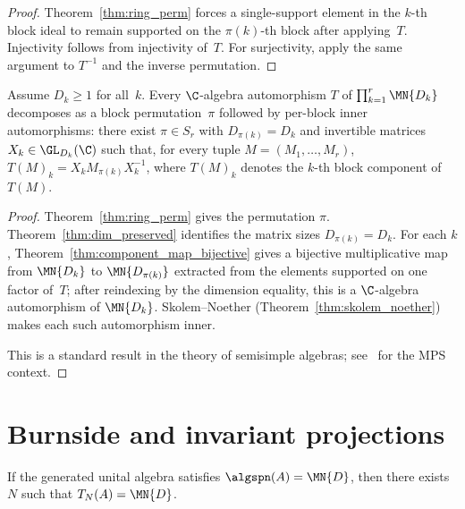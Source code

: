 \begin{proof}
    \leanok
    Theorem~\ref{thm:ring_perm} forces a single-support element in the $k$-th
    block ideal to remain supported on the $\pi(k)$-th block after applying~$T$.
    Injectivity follows from injectivity of~$T$.
    For surjectivity, apply the same argument to $T^{-1}$ and the inverse
    permutation.
\end{proof}

\begin{theorem}\label{thm:pi_auto_decomp}
    \leanok
    Assume $D_k \ge 1$ for all~$k$.
    Every $\C$-algebra automorphism $T$ of $\prod_{k=1}^r \MN{D_k}$
    decomposes as a block permutation~$\pi$ followed by
    per-block inner automorphisms:
    there exist $\pi \in S_r$ with $D_{\pi(k)} = D_k$
    and invertible matrices $X_k \in \GL_{D_k}(\C)$ such that,
    for every tuple $M = (M_1,\ldots,M_r)$,
    $T(M)_k = X_k M_{\pi(k)} X_k^{-1}$,
    where $T(M)_k$ denotes the $k$-th block component of $T(M)$.
\end{theorem}

\begin{proof}
    \leanok
    Theorem~\ref{thm:ring_perm} gives the permutation $\pi$.
    Theorem~\ref{thm:dim_preserved} identifies the matrix sizes
    $D_{\pi(k)} = D_k$.
    For each $k$, Theorem~\ref{thm:component_map_bijective} gives a bijective
    multiplicative map from $\MN{D_k}$ to $\MN{D_{\pi(k)}}$ extracted from the
    elements supported on one factor of~$T$; after reindexing by the dimension equality,
    this is a $\C$-algebra automorphism of $\MN{D_k}$.
    Skolem--Noether (Theorem~\ref{thm:skolem_noether}) makes each such
    automorphism inner.

    This is a standard result in the theory of semisimple algebras;
    see~\cite[Section~IV.A]{Cirac2021Matrix} for the MPS context.
\end{proof}

\section{Burnside and invariant projections}

\begin{lemma}\label{lem:algspan_cumulative_span}
    \leanok
    If the generated unital algebra satisfies $\algspn(A) = \MN{D}$,
    then there exists $N$ such that $T_N(A) = \MN{D}$.
\end{lemma}


